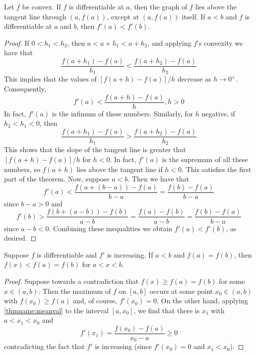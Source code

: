 \documentclass[12pt, a4paper, oneside, openright, titlepage]{book}
\begin{document}
\begin{thm}
    Let $f$ be convex. If $f$ is differentiable at $a$, then the graph of $f$ lies above the tangent line through $(a,f(a))$, except at $(a,f(a))$ itself. If $a < b$ and $f$ is differentiable at $a$ and $b$, then $f'(a) < f'(b)$.
\end{thm}
\begin{proof}
    If $0 < h_1 < h_2$, then $a < a+h_1 < a+h_2$, and applying $f$'s convexity we have that \begin{equation*}
        \frac{f(a+h_1) - f(a)}{h_1} < \frac{f(a+h_2)-f(a)}{h_2}
    \end{equation*}
    This implies that the values of $[f(a+h)-f(a)]/h$ decrease as $h\rightarrow 0^+$. Consequently, \begin{equation*}
        f'(a) < \frac{f(a+h)-f(a)}{h},h> 0
    \end{equation*}
    In fact, $f'(a)$ is the infimum of these numbers. Similarly, for $h$ negative, if $h_2 < h_1 < 0$, then \begin{equation*}
        \frac{f(a+h_1)-f(a)}{h_1} > \frac{f(a+h_2)-f(a)}{h_2}
    \end{equation*}
    This shows that the slope of the tangent line is greater that $[f(a+h)-f(a)]/h$ for $h < 0$. In fact, $f'(a)$ is the supremum of all these numbers, so $f(a+h)$ lies above the tangent line if $h < 0$. This satisfies the first part of the theorem. Now, suppose $a < b$. Then we have that \begin{equation*}
        f'(a) < \frac{f(a+(b-a)) - f(a)}{b-a} = \frac{f(b)-f(a)}{b-a}
    \end{equation*}
    since $b - a> 0$ and \begin{equation*}
        f'(b) > \frac{f(b+(a-b))-f(b)}{a-b} = \frac{f(a)-f(b)}{a-b} = \frac{f(b)-f(a)}{b-a}
    \end{equation*}
    since $a-b < 0$. Combining these inequalities we obtain $f'(a) < f'(b)$, as desired.
\end{proof}


\begin{lem}
    Suppose $f$ is differentiable and $f'$ is increasing. If $a < b$ and $f(a) = f(b)$, then $f(x) < f(a) = f(b)$ for $a < x < b$.
\end{lem}
\begin{proof}
    Suppose towards a contradiction that $f(x) \geq f(a) = f(b)$ for some $x \in (a,b)$. Then the maximum of $f$ on $[a,b]$ occurs at some point $x_0 \in (a,b)$ with $f(x_0) \geq f(a)$ and, of course, $f'(x_0) = 0$. On the other hand, applying \ref{thmname:meanval} to the interval $[a,x_0]$, we find that there is $x_1$ with $a < x_1 < x_0$ and \begin{equation*}
        f'(x_1) = \frac{f(x_0) - f(a)}{x_0 - a}\geq 0
    \end{equation*}
    contradicting the fact that $f'$ is increasing (since $f'(x_0) = 0$ and $x_1 < x_0$).
\end{proof}
\end{document}
